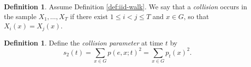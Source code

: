 \documentclass[11pt,reqno]{article}
\numberwithin{equation}{section}
\theoremstyle{plain}
\theoremstyle{definition}
\newtheorem{definition}[theorem]{Definition}
\theoremstyle{remark}
\begin{document}
\begin{definition}
  Assume Definition \ref{def:iid-walk}. We say that a \emph{collision} occurs in the sample  $X_1,\dots,X_T$ if there exist $1\le i<j\le T$ and $x\in G$, so that $ X_i (x)=X_j(x)$.
\end{definition}

\begin{definition}\label{def:s2}
Define the \emph{collision parameter} at time $t$ by
\[
s_2(t)=\sum_{x\in G}p(e,x;t)^2=\sum_{x\in G}p_t(x)^2.
\]
\end{definition}

\end{document}
